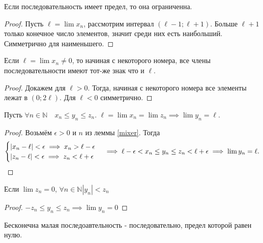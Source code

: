 \documentclass[11pt, oneside]{article}   	%
\begin{document}
        \begin{theorem}
            Если последовательность имеет предел, то она ограниченна.
            \begin{proof}
                Пусть $\ell=\lim x_n$, рассмотрим интервал $\left( \ell-1; \ell+1 \right) $. Больше $\ell+1$ только конечное число элементов, значит среди них есть наибольший. Симметрично для наименьшего.
            \end{proof}
        \end{theorem}
        \begin{theorem}
            Если $\ell=\lim x_n \neq 0$, то начиная с некоторого номера, все члены последовательности имеют тот-же знак что и $\ell$.
             \begin{proof}
                 Докажем для $\ell>0$. Тогда, начиная с некоторого номера все элементы лежат в  $\left( 0; 2\ell \right) $. Для $\ell<0$ симметрично.
            \end{proof}
        \end{theorem}
        \begin{theorem}
            Пусть $\forall{n \in \mathbb{N}}\quad x_n \le y_n \le z_n$. $\ell = \lim x_n = \lim z_n \implies \lim y_n = \ell$.
            \begin{proof}
                Возьмём $\epsilon>0$ и  $n$ из леммы \ref{mixer}. Тогда
                 \[ 
                    \begin{cases}
                        |x_n-\ell|<\epsilon \implies x_n > \ell-\epsilon\\
                        |z_n-\ell|<\epsilon \implies z_n < \ell+\epsilon
                    \end{cases}
                 \implies \ell - \epsilon < x_n \le y_n \le z_n < \ell + \epsilon \implies \lim y_n = \ell.\qedhere\]    
            \end{proof}
        \end{theorem}
        \begin{tlemma}
            Если $\lim z_n = 0$,  $\forall{n \in \mathbb{N}}|y_n| < z_n$ 
            \begin{proof}
                $-z_n \le y_n \le z_n \implies \lim y_n = 0$
            \end{proof}
        \end{tlemma}
        \begin{definition}
            Бесконечна малая последоавтельность - последовательно, предел которой равен нулю.
        \end{definition}
\end{document}
